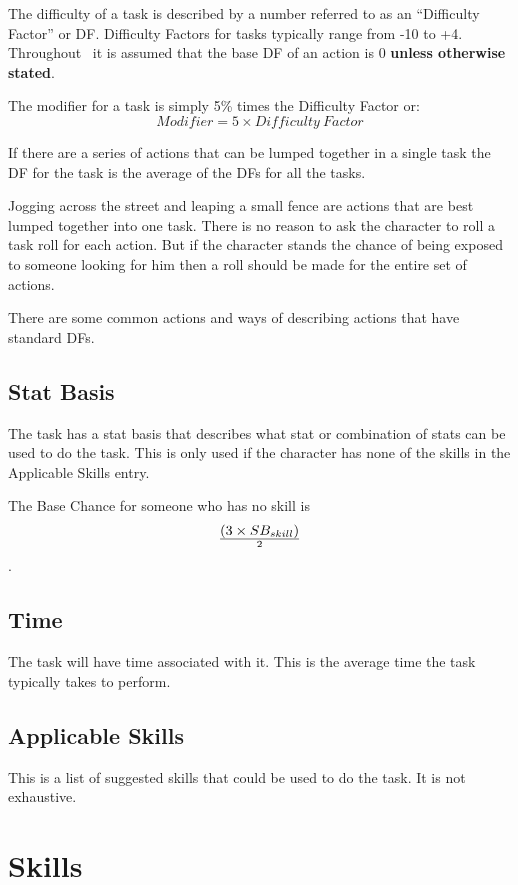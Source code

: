 The difficulty of a task is described by a number 
referred to as an ``Difficulty Factor'' or DF. Difficulty Factors 
for tasks typically range from -10  to +4. Throughout \SH\ it is 
assumed that the base DF of an action is 0 {\bf unless otherwise 
stated}. 

The modifier for a task is simply 5\% times the Difficulty Factor or:
\[ Modifier = 5 \times {Difficulty\ Factor} \]

If there are a series of actions that can be lumped 
together in a single task the DF for the task is the average of the DFs for all the tasks.

Jogging across the street and leaping a small fence are actions that 
are best lumped together into one task. There is no reason 
to ask the character to roll a task roll for each action. 
But if the character stands the chance of being exposed to
someone looking for him then a roll should be made for the entire set 
of actions. 

There are some common actions and ways of describing actions that have
standard DFs.




\subsection{Stat Basis}

The task has a stat basis that describes what stat or combination of 
stats can be used to do the task. This is only used if the character 
has none of the skills in the Applicable Skills entry. 

The Base Chance for someone who has no skill is 
\[ (3 \times SB_{skill}) \over {2} \]. 

\subsection{Time}

The task will have time associated with it. This is the average time 
the task typically takes to perform. 

\subsection{Applicable Skills}

This is a list of suggested skills that could be used to do the task. 
It is not exhaustive.

\section{Skills}

